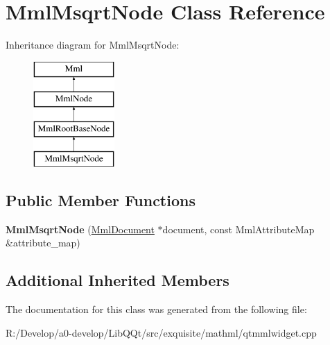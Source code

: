 \hypertarget{class_mml_msqrt_node}{}\section{Mml\+Msqrt\+Node Class Reference}
\label{class_mml_msqrt_node}
Inheritance diagram for Mml\+Msqrt\+Node\+:\begin{figure}[H]
\begin{center}
\leavevmode
\includegraphics[height=4.000000cm]{class_mml_msqrt_node}
\end{center}
\end{figure}
\subsection*{Public Member Functions}
\begin{DoxyCompactItemize}
\item 
\mbox{\label{class_mml_msqrt_node_a55cf168f00a7ed8b9abf8392dd9b943a}} 
{\bfseries Mml\+Msqrt\+Node} (\mbox{\hyperlink{class_mml_document}{Mml\+Document}} $\ast$document, const Mml\+Attribute\+Map \&attribute\+\_\+map)
\end{DoxyCompactItemize}
\subsection*{Additional Inherited Members}


The documentation for this class was generated from the following file\+:\begin{DoxyCompactItemize}
\item 
R\+:/\+Develop/a0-\/develop/\+Lib\+Q\+Qt/src/exquisite/mathml/qtmmlwidget.\+cpp\end{DoxyCompactItemize}
